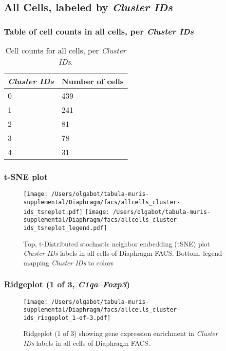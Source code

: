 \subsection{All Cells, labeled by \emph{Cluster IDs}}
\subsubsection{Table of cell counts in all cells, per \emph{Cluster IDs}}\begin{table}[h]
\centering
\label{my-label}
\begin{tabular}{@{}ll@{}}
\toprule

\emph{Cluster IDs}& Number of cells \\ \midrule
0 & 439 \\

1 & 241 \\

2 & 81 \\

3 & 78 \\

4 & 31 \\
\bottomrule
\end{tabular}
\caption{Cell counts for all cells, per \emph{Cluster IDs}.}
\end{table}

\clearpage
\subsubsection{t-SNE plot}
\begin{figure}[h]
\centering
\texttt{[image: /Users/olgabot/tabula-muris-supplemental/Diaphragm/facs/allcells\_cluster-ids\_tsneplot.pdf]}
\texttt{[image: /Users/olgabot/tabula-muris-supplemental/Diaphragm/facs/allcells\_cluster-ids\_tsneplot\_legend.pdf]}
\caption{Top, t-Distributed stochastic neighbor embedding (tSNE) plot  \emph{Cluster IDs} labels in all cells of Diaphragm FACS. Bottom, legend mapping \emph{Cluster IDs} to colors}
\end{figure}


\clearpage

\subsubsection{Ridgeplot (1 of 3, \emph{C1qa}--\emph{Foxp3})}
\begin{figure}[h]
\centering
\texttt{[image: /Users/olgabot/tabula-muris-supplemental/Diaphragm/facs/allcells\_cluster-ids\_ridgeplot\_1-of-3.pdf]}

\caption{ Ridgeplot (1 of 3)  showing gene expression enrichment in \emph{Cluster IDs} labels in all cells of Diaphragm FACS. }
\end{figure}


